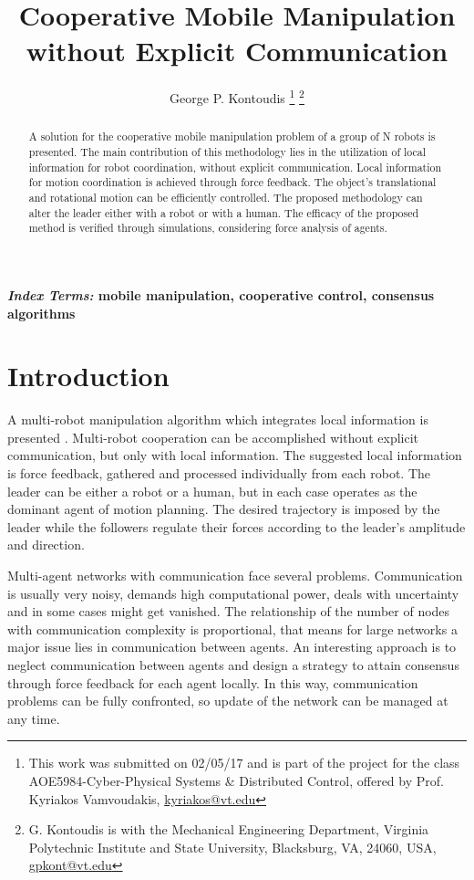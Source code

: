 \documentclass[letterpaper, 10 pt, conference]{ieeeconf}
\title{\LARGE \bf Cooperative Mobile Manipulation without Explicit Communication}
\author{George P. Kontoudis
\thanks{This work was submitted on 02/05/17 and is part of the project for the class AOE5984-Cyber-Physical Systems \& Distributed Control, offered by Prof. Kyriakos Vamvoudakis, \url{kyriakos@vt.edu}}
\thanks{G. Kontoudis is with the Mechanical Engineering Department, Virginia Polytechnic Institute and State University, Blacksburg, VA, 24060, USA, \url{gpkont@vt.edu}}}
\begin{document}
\maketitle
\thispagestyle{empty}
\pagestyle{empty}


\begin{abstract}
A solution for the cooperative mobile manipulation problem of a group of N robots is presented. The main contribution of this methodology lies in the utilization of local information for robot coordination, without explicit communication. Local information for motion coordination is achieved through force feedback. The object's translational and rotational motion can be efficiently controlled. The proposed methodology can alter the leader either with a robot or with a human. The efficacy of the proposed method is verified through simulations, considering force analysis of agents.   
\end{abstract}

\normalsize{\bf\small\emph{Index Terms:} mobile manipulation, cooperative control, consensus algorithms}  


\section{Introduction}\label{intro}

A multi-robot manipulation algorithm which integrates local information is presented \cite{wang2016force}. Multi-robot cooperation can be accomplished without explicit communication, but only with local information. The suggested local information is force feedback, gathered and processed individually from each robot. The leader can be either a robot or a human, but in each case operates as the dominant agent of motion planning. The desired trajectory is imposed by the leader while the followers regulate their forces according to the leader's amplitude and direction.   

Multi-agent networks with communication face several problems. Communication is usually very noisy, demands high computational power, deals with uncertainty and in some cases might get vanished. The relationship of the number of nodes with communication complexity is proportional, that means for large networks a major issue lies in communication between agents. An interesting approach is to neglect communication between agents and design a strategy to attain consensus through force feedback for each agent locally. In this way, communication problems can be fully confronted, so update of the network can be managed at any time. 
\end{document}

